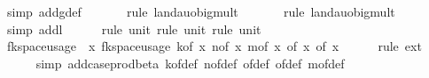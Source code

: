 \begin{isabellebody}
\ {\isacharparenleft}{\kern0pt}simp\ add{\isacharcolon}{\kern0pt}g{\isacharunderscore}{\kern0pt}def{\isacharparenright}{\kern0pt}\isanewline
\ \ \ \ \ \isamarkupfalse%
\ {\isacharparenleft}{\kern0pt}rule\ landau{\isacharunderscore}{\kern0pt}o{\isachardot}{\kern0pt}big{\isacharunderscore}{\kern0pt}mult{\isacharunderscore}{\kern0pt}{}{\isacharparenright}{\kern0pt}\isanewline
\ \ \ \ \ \isamarkupfalse%
\ {\isacharparenleft}{\kern0pt}rule\ landau{\isacharunderscore}{\kern0pt}o{\isachardot}{\kern0pt}big{\isacharunderscore}{\kern0pt}mult{\isacharunderscore}{\kern0pt}{}{\isacharparenright}{\kern0pt}\isanewline
\ \ \ \ \ \ \ \isamarkupfalse%
\ {\isacharparenleft}{\kern0pt}simp\ add{\isacharcolon}{\kern0pt}l{}{\isacharparenright}{\kern0pt}\isanewline
\ \ \ \ \isamarkupfalse%
\ {\isacharparenleft}{\kern0pt}rule\ unit{\isacharunderscore}{\kern0pt}{}{\isacharcomma}{\kern0pt}\ rule\ unit{\isacharunderscore}{\kern0pt}{}{\isacharcomma}{\kern0pt}\ rule\ unit{\isacharunderscore}{\kern0pt}{}{\isacharparenright}{\kern0pt}\isanewline
\isanewline
\ \ \isamarkupfalse%
\ {\isachardoublequoteopen}fk{\isacharunderscore}{\kern0pt}space{\isacharunderscore}{\kern0pt}usage\ {\isacharequal}{\kern0pt}\ {\isacharparenleft}{\kern0pt}{\isasymlambda}x{\isachardot}{\kern0pt}\ fk{\isacharunderscore}{\kern0pt}space{\isacharunderscore}{\kern0pt}usage\ {\isacharparenleft}{\kern0pt}k{\isacharunderscore}{\kern0pt}of\ x{\isacharcomma}{\kern0pt}\ n{\isacharunderscore}{\kern0pt}of\ x{\isacharcomma}{\kern0pt}\ m{\isacharunderscore}{\kern0pt}of\ x{\isacharcomma}{\kern0pt}\ {\isasymepsilon}{\isacharunderscore}{\kern0pt}of\ x{\isacharcomma}{\kern0pt}\ {\isasymdelta}{\isacharunderscore}{\kern0pt}of\ x{\isacharparenright}{\kern0pt}{\isacharparenright}{\kern0pt}{\isachardoublequoteclose}\isanewline
\ \ \ \ \isamarkupfalse%
\ {\isacharparenleft}{\kern0pt}rule\ ext{\isacharparenright}{\kern0pt}\isanewline
\ \ \ \ \isamarkupfalse%
\ {\isacharparenleft}{\kern0pt}simp\ add{\isacharcolon}{\kern0pt}case{\isacharunderscore}{\kern0pt}prod{\isacharunderscore}{\kern0pt}beta{\isacharprime}{\kern0pt}\ k{\isacharunderscore}{\kern0pt}of{\isacharunderscore}{\kern0pt}def\ n{\isacharunderscore}{\kern0pt}of{\isacharunderscore}{\kern0pt}def\ {\isasymepsilon}{\isacharunderscore}{\kern0pt}of{\isacharunderscore}{\kern0pt}def\ {\isasymdelta}{\isacharunderscore}{\kern0pt}of{\isacharunderscore}{\kern0pt}def\ m{\isacharunderscore}{\kern0pt}of{\isacharunderscore}{\kern0pt}def{\isacharparenright}{\kern0pt}\isanewline

\end{isabellebody}
